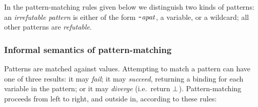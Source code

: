 
In the pattern-matching rules given below we distinguish two kinds of
patterns: an {\em irrefutable pattern}
is either of the form \mbox{$\it \makebox{\tt {\char'176}}apat$}, a variable, or a wildcard; all
other patterns are {\em refutable}.

\subsubsection{Informal semantics of pattern-matching}

Patterns are matched against values.  Attempting to match a pattern
can have one of three results: it may {\em fail\/}; it may {\em
succeed}, returning a binding for each variable in the pattern; or it
may {\em diverge} (i.e.~return \mbox{$\it \bot$}).  Pattern-matching proceeds
from left to right, and outside in, according to these rules:
